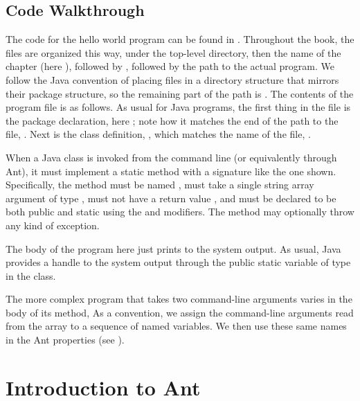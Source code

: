 \subsection{Code Walkthrough}\label{section-intro-hello-code}

The code for the hello world program can be found in
.
Throughout the book, the files are organized this way, under the
top-level  directory, then the name of the chapter (here
), followed by , followed by the path to
the actual program.  We follow the Java convention of placing files in
a directory structure that mirrors their package structure, so the
remaining part of the path is
.  The contents of
the  program file is as follows.
%
%
As usual for Java programs, the first thing in the file is the package
declaration, here ; note how it matches
the end of the path to the file, .
Next is the class definition, , which matches the
name of the file, .

When a Java class is invoked from the command line (or equivalently
through Ant), it must implement a static method with a signature like
the one shown.  Specifically, the method must be named ,
must take a single string array argument of type , must
not have a return value , and must be
declared to be both public and static using the
 and  modifiers.  The method may optionally throw
any kind of exception.

The body of the program here just prints  to the
system output.  As usual, Java provides a handle to the system output
through the public static variable  of type
 in the  class.

The more complex program  that takes two
command-line arguments varies in the body of its  method, 
%
%
As a convention, we assign the command-line arguments read
from the array  to a sequence of named variables.  
We then use these same names in the Ant properties (see ).

\section{Introduction to Ant}

